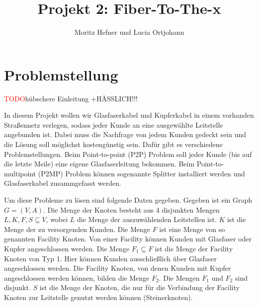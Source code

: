 \documentclass[11pt,a4paper]{article}
\title{Projekt 2: Fiber-To-The-x}
\author{Moritz Hefner und Lucia Ortjohann}
\newcommand{\TODO}{\textcolor{red}{TODO}}
\theoremstyle{my_th_style1}
\begin{document}
\maketitle
\thispagestyle{empty}
\newpage
\tableofcontents
\thispagestyle{empty}
\newpage
\setcounter{page}{1}



\section{Problemstellung}
\TODO hübschere Einleitung +HÄSSLICH!!!

In diesem Projekt wollen wir Glasfaserkabel und Kupferkabel in einem vorhanden Straßennetz verlegen, sodass jeder Kunde an eine ausgewählte Leitstelle angebunden ist. Dabei muss die Nachfrage von jedem Kunden gedeckt sein und die Lösung soll möglichst kostengünstig sein. Dafür gibt es verschiedene Problemstellungen. Beim Point-to-point (P2P) Problem soll jeder Kunde (bis auf die letzte Meile) eine eigene Glasfaserleitung bekommen. Beim Point-to-multipoint (P2MP) Problem können sogenannte Splitter installiert werden und Glasfaserkabel zusammgefasst werden.

Um diese Probleme zu lösen sind folgende Daten gegeben. 
Gegeben ist ein Graph $G=(V,A)$. Die Menge der Knoten besteht aus 4 disjunkten Mengen $L,K,F,S \subseteq V$, wobei $L$ die Menge der auszuwählenden Leitstellen ist. $K$ ist die Menge der zu versorgenden Kunden. Die Menge $F$ ist eine Menge von so genannten Facility Knoten. Von einer Facility können Kunden mit Glasfaser oder Kupfer angeschlossen werden. Die Menge $F_1 \subseteq F$ ist die Menge der Facility Knoten von Typ 1. Hier können Kunden ausschließlich über Glasfaser angeschlossen werden. Die Facility Knoten, von denen Kunden mit Kupfer angeschlossen werden können, bilden die Menge $F_2$. Die Mengen $F_1$ und $F_2$ sind disjunkt.
$S$ ist die Menge der Knoten, die nur für die Verbindung der Facility Knoten zur Leitstelle genutzt werden k\"onnen (Steinerknoten). 
\end{document}
